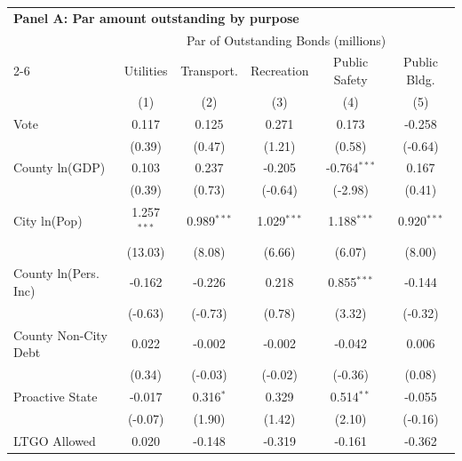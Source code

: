 \begingroup
\centering
\begin{tabular*}{\textwidth}{@{\extracolsep{\fill}}lccccc}
\multicolumn{6}{l}{\textbf{Panel A: Par amount outstanding by purpose}}\\

\addlinespace
   \toprule
    & \multicolumn{5}{c}{Par of Outstanding Bonds (millions)}\\
   \cmidrule(lr){2-6}
                               & Utilities     & Transport.     & Recreation     & Public Safety  & Public Bldg. \\   
                               & (1)           & (2)            & (3)            & (4)            & (5)\\  
   \midrule 
   Vote                        & 0.117         & 0.125          & 0.271          & 0.173          & -0.258\\   
                               & (0.39)       & (0.47)        & (1.21)        & (0.58)        & (-0.64)\\   
   County ln(GDP)              & 0.103         & 0.237          & -0.205         & -0.764$^{***}$ & 0.167\\   
                               & (0.39)       & (0.73)        & (-0.64)       & (-2.98)       & (0.41)\\   
   City ln(Pop)                & 1.257$^{***}$ & 0.989$^{***}$  & 1.029$^{***}$  & 1.188$^{***}$  & 0.920$^{***}$\\   
                               & (13.03)      & (8.08)        & (6.66)        & (6.07)        & (8.00)\\   
   County ln(Pers. Inc)        & -0.162        & -0.226         & 0.218          & 0.855$^{***}$  & -0.144\\   
                               & (-0.63)      & (-0.73)       & (0.78)        & (3.32)        & (-0.32)\\   
   County Non-City Debt        & 0.022         & -0.002         & -0.002         & -0.042         & 0.006\\   
                               & (0.34)       & (-0.03)       & (-0.02)       & (-0.36)       & (0.08)\\   
   Proactive State             & -0.017        & 0.316$^{*}$    & 0.329          & 0.514$^{**}$   & -0.055\\   
                               & (-0.07)      & (1.90)        & (1.42)        & (2.10)        & (-0.16)\\   
   LTGO Allowed                & 0.020         & -0.148         & -0.319         & -0.161         & -0.362\\   

\end{tabular*}
